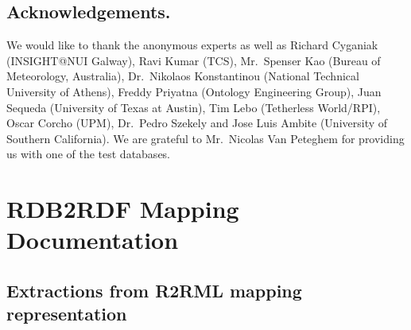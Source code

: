 \section*{Acknowledgements.}
We would like to thank the anonymous experts as well as Richard Cyganiak (INSIGHT@NUI Galway), Ravi Kumar (TCS), Mr.\ Spenser Kao (Bureau of Meteorology, Australia), Dr.\ Nikolaos Konstantinou (National Technical University of Athens), Freddy Priyatna (Ontology Engineering Group), Juan Sequeda (University of Texas at Austin), Tim Lebo (Tetherless World/RPI), Oscar Corcho (UPM), Dr.\ Pedro Szekely and Jose Luis Ambite (University of Southern California).
We are grateful to Mr.\ Nicolas Van Peteghem for providing us with one of the test databases.



\chapter{RDB2RDF Mapping Documentation}
\label{sec:app1}
\section{Extractions from R2RML mapping representation}
\label{app1:r2rml}


